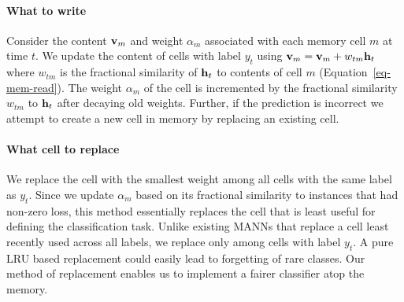 \documentclass[letterpaper]{article} %
\newcommand{\vek}[1]{{\bf {#1}}}
\newcommand{\vh}{{\vek{h}}}
\newcommand{\vM}{{\vek{v}}}
\begin{document}
\paragraph{What to write}
Consider the content $\vM_m$ and weight $\alpha_m$ associated with
each memory cell $m$ at time $t$.   We update the content of cells with label $y_t$ using $\vM_{m} = \vM_{m} + w_{tm}{\vh_t}$ where $w_{tm}$ is the fractional similarity of $\vh_t$ to contents of cell $m$ (Equation~\ref{eq-mem-read}). The weight $\alpha_m$ of the cell is incremented by the fractional similarity $w_{tm}$ to $\vh_t$ after decaying old weights.
Further, if the prediction is incorrect we attempt to create a new cell in memory  by replacing an existing cell.  
%
\paragraph{What cell to replace} We replace the cell with the smallest weight among all cells with the same label as $y_t$. %
Since we update $\alpha_m$ based on its fractional similarity to instances that had non-zero loss, this method essentially replaces the cell that is least useful for defining the classification task.  Unlike existing MANNs that replace a cell least recently used across all labels, we replace only among cells with label $y_t$. A pure LRU based replacement could easily lead to forgetting of rare classes.  Our method of replacement enables us to implement a fairer classifier atop the memory. 
\end{document}
